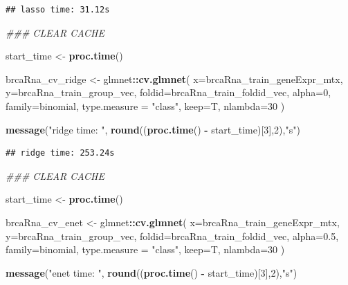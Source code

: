 \documentclass[
]{book}
\newenvironment{Shaded}{\begin{snugshade}}{\end{snugshade}}
\newcommand{\CommentTok}[1]{\textcolor[rgb]{0.56,0.35,0.01}{\textit{#1}}}
\newcommand{\DataTypeTok}[1]{\textcolor[rgb]{0.13,0.29,0.53}{#1}}
\newcommand{\DecValTok}[1]{\textcolor[rgb]{0.00,0.00,0.81}{#1}}
\newcommand{\FloatTok}[1]{\textcolor[rgb]{0.00,0.00,0.81}{#1}}
\newcommand{\KeywordTok}[1]{\textcolor[rgb]{0.13,0.29,0.53}{\textbf{#1}}}
\newcommand{\NormalTok}[1]{#1}
\newcommand{\OperatorTok}[1]{\textcolor[rgb]{0.81,0.36,0.00}{\textbf{#1}}}
\newcommand{\StringTok}[1]{\textcolor[rgb]{0.31,0.60,0.02}{#1}}
\begin{document}
\begin{verbatim}
## lasso time: 31.12s
\end{verbatim}

\begin{Shaded}
\begin{Highlighting}[]
\CommentTok{\#\#\# CLEAR CACHE}

\NormalTok{start\_time <{-}}\StringTok{  }\KeywordTok{proc.time}\NormalTok{()}

\NormalTok{brcaRna\_cv\_ridge <{-}}\StringTok{ }\NormalTok{glmnet}\OperatorTok{::}\KeywordTok{cv.glmnet}\NormalTok{(}
 \DataTypeTok{x=}\NormalTok{brcaRna\_train\_geneExpr\_mtx,}
 \DataTypeTok{y=}\NormalTok{brcaRna\_train\_group\_vec,}
 \DataTypeTok{foldid=}\NormalTok{brcaRna\_train\_foldid\_vec,}
 \DataTypeTok{alpha=}\DecValTok{0}\NormalTok{,}
 \DataTypeTok{family=}\StringTok{\textquotesingle{}binomial\textquotesingle{}}\NormalTok{, }
 \DataTypeTok{type.measure =} \StringTok{"class"}\NormalTok{,}
 \DataTypeTok{keep=}\NormalTok{T,}
 \DataTypeTok{nlambda=}\DecValTok{30}
\NormalTok{)}

\KeywordTok{message}\NormalTok{(}\StringTok{"ridge time: "}\NormalTok{, }\KeywordTok{round}\NormalTok{((}\KeywordTok{proc.time}\NormalTok{() }\OperatorTok{{-}}\StringTok{ }\NormalTok{start\_time)[}\DecValTok{3}\NormalTok{],}\DecValTok{2}\NormalTok{),}\StringTok{"s"}\NormalTok{)}
\end{Highlighting}
\end{Shaded}

\begin{verbatim}
## ridge time: 253.24s
\end{verbatim}

\begin{Shaded}
\begin{Highlighting}[]
\CommentTok{\#\#\# CLEAR CACHE}

\NormalTok{start\_time <{-}}\StringTok{  }\KeywordTok{proc.time}\NormalTok{()}

\NormalTok{brcaRna\_cv\_enet <{-}}\StringTok{ }\NormalTok{glmnet}\OperatorTok{::}\KeywordTok{cv.glmnet}\NormalTok{(}
 \DataTypeTok{x=}\NormalTok{brcaRna\_train\_geneExpr\_mtx,}
 \DataTypeTok{y=}\NormalTok{brcaRna\_train\_group\_vec,}
 \DataTypeTok{foldid=}\NormalTok{brcaRna\_train\_foldid\_vec,}
 \DataTypeTok{alpha=}\FloatTok{0.5}\NormalTok{,}
 \DataTypeTok{family=}\StringTok{\textquotesingle{}binomial\textquotesingle{}}\NormalTok{,}
 \DataTypeTok{type.measure =} \StringTok{"class"}\NormalTok{,}
 \DataTypeTok{keep=}\NormalTok{T,}
 \DataTypeTok{nlambda=}\DecValTok{30}
\NormalTok{)}

\KeywordTok{message}\NormalTok{(}\StringTok{"enet time: "}\NormalTok{, }\KeywordTok{round}\NormalTok{((}\KeywordTok{proc.time}\NormalTok{() }\OperatorTok{{-}}\StringTok{ }\NormalTok{start\_time)[}\DecValTok{3}\NormalTok{],}\DecValTok{2}\NormalTok{),}\StringTok{"s"}\NormalTok{)}
\end{Highlighting}
\end{Shaded}
\end{document}
